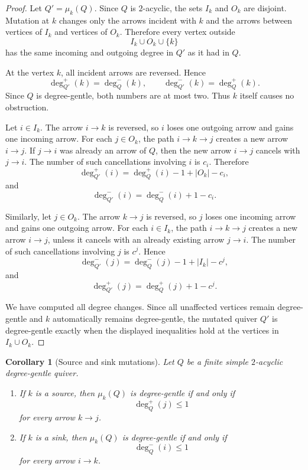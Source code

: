 \documentclass[11pt]{article}
\theoremstyle{plain}
\newtheorem{corollary}[theorem]{Corollary}
\theoremstyle{definition}
\theoremstyle{remark}
\begin{document}
\begin{proof}
Let \(Q'=\mu_k(Q)\).  Since \(Q\) is \(2\)-acyclic, the sets \(I_k\) and \(O_k\)
are disjoint.  Mutation at \(k\) changes only the arrows incident with \(k\) and
the arrows between vertices of \(I_k\) and vertices of \(O_k\).  Therefore every
vertex outside
\[
  I_k\cup O_k\cup\{k\}
\]
has the same incoming and outgoing degree in \(Q'\) as it had in \(Q\).

At the vertex \(k\), all incident arrows are reversed.  Hence
\[
  \deg_{Q'}^+(k)=\deg_Q^-(k),
  \qquad
  \deg_{Q'}^-(k)=\deg_Q^+(k).
\]
Since \(Q\) is degree-gentle, both numbers are at most two.  Thus \(k\) itself
causes no obstruction.

Let \(i\in I_k\).  The arrow \(i\to k\) is reversed, so \(i\) loses one outgoing
arrow and gains one incoming arrow.  For each \(j\in O_k\), the path
\(i\to k\to j\) creates a new arrow \(i\to j\).  If \(j\to i\) was already an
arrow of \(Q\), then the new arrow \(i\to j\) cancels with \(j\to i\).  The
number of such cancellations involving \(i\) is \(c_i\).  Therefore
\[
  \deg_{Q'}^+(i)=\deg_Q^+(i)-1+|O_k|-c_i,
\]
and
\[
  \deg_{Q'}^-(i)=\deg_Q^-(i)+1-c_i.
\]

Similarly, let \(j\in O_k\).  The arrow \(k\to j\) is reversed, so \(j\) loses
one incoming arrow and gains one outgoing arrow.  For each \(i\in I_k\), the
path \(i\to k\to j\) creates a new arrow \(i\to j\), unless it cancels with an
already existing arrow \(j\to i\).  The number of such cancellations involving
\(j\) is \(c^j\).  Hence
\[
  \deg_{Q'}^-(j)=\deg_Q^-(j)-1+|I_k|-c^j,
\]
and
\[
  \deg_{Q'}^+(j)=\deg_Q^+(j)+1-c^j.
\]

We have computed all degree changes.  Since all unaffected vertices remain
degree-gentle and \(k\) automatically remains degree-gentle, the mutated quiver
\(Q'\) is degree-gentle exactly when the displayed inequalities hold at the
vertices in \(I_k\cup O_k\).
\end{proof}

\begin{corollary}[Source and sink mutations]\label{cor:source-sink}
Let \(Q\) be a finite simple \(2\)-acyclic degree-gentle quiver.
\begin{enumerate}[label=(\arabic*),leftmargin=2em]
  \item If \(k\) is a source, then \(\mu_k(Q)\) is degree-gentle if and only if
  \[
    \deg_Q^+(j)\leq 1
  \]
  for every arrow \(k\to j\).
  \item If \(k\) is a sink, then \(\mu_k(Q)\) is degree-gentle if and only if
  \[
    \deg_Q^-(i)\leq 1
  \]
  for every arrow \(i\to k\).
\end{enumerate}
\end{corollary}
\end{document}
